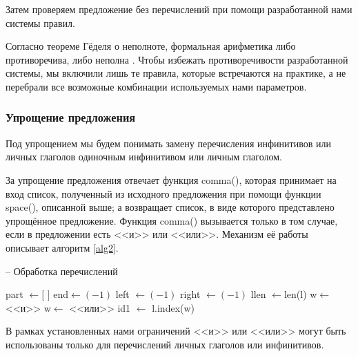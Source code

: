 \documentclass[main]{subfiles}
\begin{document}
Затем проверяем предложение без перечислений при помощи разработанной нами системы правил. 

Согласно теореме Гёделя о неполноте, формальная арифметика либо противоречива, либо неполна \cite{forms}. Чтобы избежать противоречивости разработанной системы, мы включили лишь те правила, которые встречаются на практике, а не перебрали все возможные комбинации используемых нами параметров.

\subsubsection{Упрощение предложения}
Под упрощением мы будем понимать замену перечисления инфинитивов или личных глаголов одиночным инфинитивом или личным глаголом. 

За упрощение предложения отвечает функция comma(), которая принимает на вход список, полученный из исходного предложения при помощи функции space(), описанной выше; а возвращает список, в виде которого представлено упрощённое предложение. Функция comma() вызывается только в том случае, если в предложении есть <<и>> или <<или>>. Механизм её работы описывает алгоритм \ref{alg2}.

\begin{algorithm}
	\caption{-- Обработка перечислений}\label{alg2}
	\begin{algorithmic}[1]
		 
		\State part $\gets [$ $]$ 
		\State end$\gets (-1)$ 
		\State left $\gets (-1)$ 
		\State right $\gets (-1)$
		\State llen $\gets $len(l) 
		\State w$\gets$ <<и>>
		\State w$\gets$ <<или>>
		\EndIf
		\State id1 $\gets$ l.index(w) 
	\end{algorithmic}
\end{algorithm}
В рамках установленных нами ограничений <<и>> или <<или>> могут быть использованы только для перечислений личных глаголов или инфинитивов.
\end{document}
